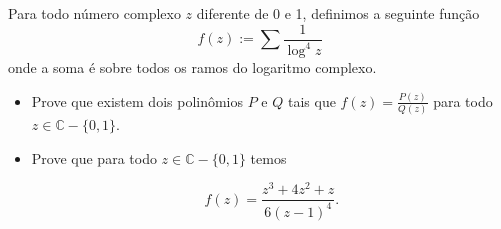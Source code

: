 Para todo número complexo \(z\) diferente de 0 e 1, definimos a seguinte função
\[  f(z) := \sum \frac 1 {  \log^4 z } \]
onde a soma é sobre todos os ramos do logaritmo complexo.
\begin{itemize}

\item[(a)] Prove que existem dois polinômios \(P\) e \(Q\) tais que \(f(z) = \displaystyle \frac {P(z)}{Q(z)} \) para todo \(z\in\mathbb{C}-\{0,1\}\).

\item[(b)] Prove que para todo \(z\in \mathbb{C}-\{0,1\}\) temos

\[ f(z) = \frac { z^3+4z^2+z}{6(z-1)^4}. \]
\end{itemize}
